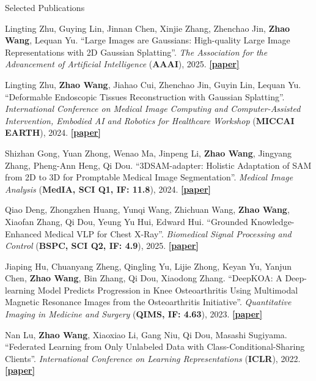 \documentclass[a4paper]{resume} %
\begin{document}
\begin{rSection}{Selected Publications}
\begin{enumerate}[label={[\arabic*]}, topsep=0em, leftmargin=1.4em, itemsep=-0.5em]
\item Lingting Zhu, Guying Lin, Jinnan Chen, Xinjie Zhang, Zhenchao Jin, {\bf Zhao Wang}, Lequan Yu. “Large Images are Gaussians: High-quality Large Image Representations with 2D Gaussian Splatting”. {\it The Association for the Advancement of Artificial Intelligence} ({\bf AAAI}), 2025. \href{https://arxiv.org/abs/2502.09039}{\bf [paper]}

\item Lingting Zhu, {\bf Zhao Wang}, Jiahao Cui, Zhenchao Jin, Guyin Lin, Lequan Yu. “Deformable Endoscopic Tissues Reconstruction with Gaussian Splatting”. {\it International Conference on Medical Image Computing and Computer-Assisted Intervention, Embodied AI and Robotics for Healthcare Workshop} ({\bf MICCAI EARTH}), 2024. \href{https://arxiv.org/abs/2401.11535}{\bf [paper]}


\item Shizhan Gong, Yuan Zhong, Wenao Ma, Jinpeng Li, {\bf Zhao Wang}, Jingyang Zhang, Pheng-Ann Heng, Qi Dou. “3DSAM-adapter: Holistic Adaptation of SAM from 2D to 3D for Promptable Medical Image Segmentation”. {\it Medical Image Analysis} ({\bf MedIA, SCI Q1, IF: 11.8}), 2024. \href{https://arxiv.org/abs/2306.13465}{\bf [paper]}


\item Qiao Deng, Zhongzhen Huang, Yunqi Wang, Zhichuan Wang, {\bf Zhao Wang}, Xiaofan Zhang, Qi Dou, Yeung Yu Hui, Edward Hui. “Grounded Knowledge-Enhanced Medical VLP for Chest X-Ray”. {\it Biomedical Signal Processing and Control} ({\bf BSPC, SCI Q2, IF: 4.9}),  2025. \href{https://arxiv.org/abs/2404.14750}{\bf [paper]}


\item Jiaping Hu, Chuanyang Zheng, Qingling Yu, Lijie Zhong, Keyan Yu, Yanjun Chen, {\bf Zhao Wang}, Bin Zhang, Qi Dou, Xiaodong Zhang. “DeepKOA: A Deep-learning Model Predicts Progression in Knee Osteoarthritis Using Multimodal Magnetic Resonance Images from the Osteoarthritis Initiative”. {\it Quantitative Imaging in Medicine and Surgery} ({\bf QIMS, IF: 4.63}), 2023. \href{https://qims.amegroups.com/article/view/114391}{\bf [paper]}

\item Nan Lu, {\bf Zhao Wang}, Xiaoxiao Li, Gang Niu, Qi Dou, Masashi Sugiyama. “Federated Learning from Only Unlabeled Data with Class-Conditional-Sharing Clients”. {\it International Conference on Learning Representations} ({\bf ICLR}), 2022. \href{https://openreview.net/forum?id=WHA8009laxu}{\bf [paper]}






\end{enumerate}
\end{rSection}
\end{document}
